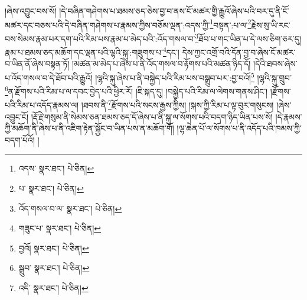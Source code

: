 །ཞེས་འབྱུང་བས་སོ། །དེ་བཞིན་གཤེགས་པ་ཐམས་ཅད་ཅེས་བྱ་བ་ནས་ངོ་མཚར་གྱི་རྒྱུའོ་ཞེས་པའི་བར་དུ་ནི་ངོ་མཚར་དང་བཅས་པའི་དེ་བཞིན་གཤེགས་པ་རྣམས་ཀྱིས་བཅོམ་ལྡན་:འདས་ཀྱི་\footnote{འདས་  སྣར་ཐང་།  པེ་ཅིན། }བསྟན་:པ་ལ་\footnote{པ་  སྣར་ཐང་།  པེ་ཅིན། }རྗེས་སུ་ཡི་རང་བས་སེམས་རྣམ་པར་དག་པའི་རིམ་པས་རྣམ་པ་མེད་པའི་:འོད་གསལ་བ་\footnote{འོད་གསལ་བ་ལ་  སྣར་ཐང་།  པེ་ཅིན། }ཐོབ་པ་གང་ཡིན་པ་དེ་ལས་ཅིག་ཅར་དུ། རྣམ་པ་ཐམས་ཅད་མཆོག་དང་ལྡན་པའི་ལྷའི་སྐུ་:གཟུགས་པ་\footnote{གཟུང་པ་  སྣར་ཐང་།  པེ་ཅིན། }དང་། དེས་ཀྱང་འགྲོ་བའི་དོན་བྱ་བ་ཞེས་ངོ་མཚར་བ་ཡིན་ནོ་ཞེས་བསྟན་ཏོ། །མཚན་མ་མེད་པ་ཞེས་པ་ནི་འོད་གསལ་བ་རྟོགས་པའི་མཚན་ཉིད་དོ། །དེའི་ཐབས་ཞེས་པ་འོད་གསལ་བ་དེ་ཐོབ་པའི་རྒྱུའོ། །ལྷའི་སྐུ་ཞེས་པ་ནི་བསྐྱེད་པའི་རིམ་པས་བསྒྲུབ་པར་:བྱ་བའོ།\footnote{བྱའོ།  སྣར་ཐང་།  པེ་ཅིན། } །ལྷའི་སྐུ་གྲུབ་\footnote{སྒྲུབ་  སྣར་ཐང་།  པེ་ཅིན། }ན་རྫོགས་པའི་རིམ་པ་ལ་དབང་བྱེད་པའི་ཕྱིར་རོ། །ཇི་སྐད་དུ། །བསྐྱེད་པའི་རིམ་ལ་ལེགས་གནས་ཤིང་། །རྫོགས་པའི་རིམ་པ་འདོད་རྣམས་ལ། །ཐབས་ནི་\footnote{འདི་  སྣར་ཐང་།  པེ་ཅིན། }རྫོགས་པའི་སངས་རྒྱས་ཀྱིས། །སྐས་ཀྱི་རིམ་པ་ལྟ་བུར་གསུངས། །ཞེས་འབྱུང་ངོ། །རྡོ་རྗེ་གསུམ་ནི་སེམས་ཅན་ཐམས་ཅད་དོ་ཞེས་པ་ནི་སྐུ་ལ་སོགས་པའི་བདག་ཉིད་ཡིན་པས་སོ། །དེ་རྣམས་ཀྱི་མཆོག་ནི་ཞེས་པ་ནི་འཇིག་རྟེན་སྐྱོང་བ་ཡིན་པས་ན་མཆོག་གོ། །ལྷ་ཆེན་པོ་ལ་སོགས་པ་ནི་འདོད་པའི་ཁམས་ཀྱི་བདག་པོའོ། །
